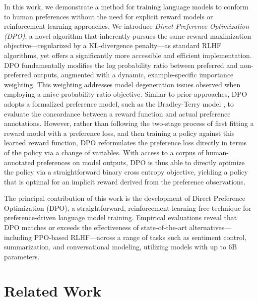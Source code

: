 In this work, we demonstrate a method for training language models to conform to human preferences without the need for explicit reward models or reinforcement learning approaches. We introduce \textit{{Direct Preference Optimization} (DPO)}, a novel algorithm that inherently pursues the same reward maximization objective—regularized by a KL-divergence penalty—as standard RLHF algorithms, yet offers a significantly more accessible and efficient implementation. DPO fundamentally modifies the log probability ratio between preferred and non-preferred outputs, augmented with a dynamic, example-specific importance weighting. This weighting addresses model degeneration issues observed when employing a naive probability ratio objective. Similar to prior approaches, DPO adopts a formalized preference model, such as the Bradley-Terry model \cite{bradley1952rankanalysis}, to evaluate the concordance between a reward function and actual preference annotations. However, rather than following the two-stage process of first fitting a reward model with a preference loss, and then training a policy against this learned reward function, DPO reformulates the preference loss directly in terms of the policy via a change of variables. With access to a corpus of human-annotated preferences on model outputs, DPO is thus able to directly optimize the policy via a straightforward binary cross entropy objective, yielding a policy that is optimal for an implicit reward derived from the preference observations.

The principal contribution of this work is the development of Direct Preference Optimization (DPO), a straightforward, reinforcement-learning-free technique for preference-driven language model training. Empirical evaluations reveal that DPO matches or exceeds the effectiveness of state-of-the-art alternatives—including PPO-based RLHF—across a range of tasks such as sentiment control, summarization, and conversational modeling, utilizing models with up to 6B parameters.

\section{Related Work}

